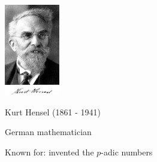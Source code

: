 \begin{frame}
	\hfil\hfil \includegraphics[height=4cm]{../../modules/history/pictures/hensel.jpg}
	
	\hfil\hfil Kurt Hensel (1861 - 1941)
	
	\hfil\hfil German mathematician
	

	\hfil\hfil Known for: 	invented the $p$-adic numbers
	
	
\end{frame}